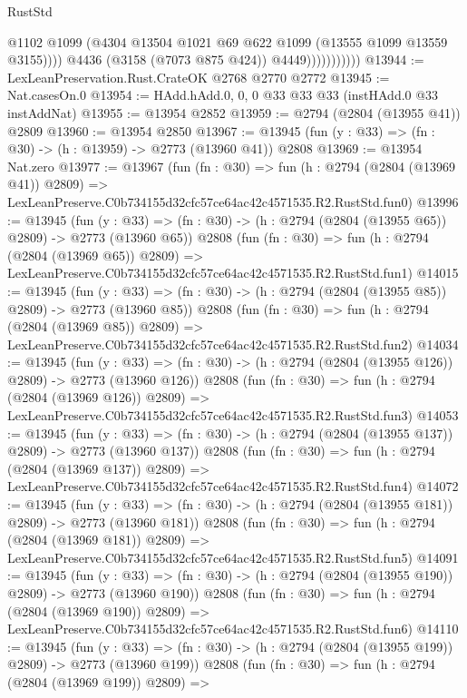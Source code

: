 \begin{lexlean}{RustStd}
\begin{coremodule}
                              @1102
                              @1099
                              (@4304 @13504 @1021 @69 @622 @1099 (@13555 @1099 @13559 @3155))))
                          @4436
                          (@3158 (@7073 @875 @424))
                          @4449)))))))))))
@13944 := LexLeanPreservation.Rust.CrateOK @2768 @2770 @2772
@13945 := Nat.casesOn.{0}
@13954 := HAdd.hAdd.{0, 0, 0} @33 @33 @33 (instHAdd.{0} @33 instAddNat)
@13955 := @13954 @2852
@13959 := @2794 (@2804 (@13955 @41)) @2809
@13960 := @13954 @2850
@13967 := @13945 (fun (y : @33) => (fn : @30) -> (h : @13959) -> @2773 (@13960 @41)) @2808
@13969 := @13954 Nat.zero
@13977 := @13967
    (fun (fn : @30) =>
    fun (h : @2794 (@2804 (@13969 @41)) @2809) =>
    LexLeanPreserve.C0b734155d32cfc57ce64ac42c4571535.R2.RustStd.fun0)
@13996 := @13945
    (fun (y : @33) => (fn : @30) -> (h : @2794 (@2804 (@13955 @65)) @2809) -> @2773 (@13960 @65))
    @2808
    (fun (fn : @30) =>
    fun (h : @2794 (@2804 (@13969 @65)) @2809) =>
    LexLeanPreserve.C0b734155d32cfc57ce64ac42c4571535.R2.RustStd.fun1)
@14015 := @13945
    (fun (y : @33) => (fn : @30) -> (h : @2794 (@2804 (@13955 @85)) @2809) -> @2773 (@13960 @85))
    @2808
    (fun (fn : @30) =>
    fun (h : @2794 (@2804 (@13969 @85)) @2809) =>
    LexLeanPreserve.C0b734155d32cfc57ce64ac42c4571535.R2.RustStd.fun2)
@14034 := @13945
    (fun (y : @33) => (fn : @30) -> (h : @2794 (@2804 (@13955 @126)) @2809) -> @2773 (@13960 @126))
    @2808
    (fun (fn : @30) =>
    fun (h : @2794 (@2804 (@13969 @126)) @2809) =>
    LexLeanPreserve.C0b734155d32cfc57ce64ac42c4571535.R2.RustStd.fun3)
@14053 := @13945
    (fun (y : @33) => (fn : @30) -> (h : @2794 (@2804 (@13955 @137)) @2809) -> @2773 (@13960 @137))
    @2808
    (fun (fn : @30) =>
    fun (h : @2794 (@2804 (@13969 @137)) @2809) =>
    LexLeanPreserve.C0b734155d32cfc57ce64ac42c4571535.R2.RustStd.fun4)
@14072 := @13945
    (fun (y : @33) => (fn : @30) -> (h : @2794 (@2804 (@13955 @181)) @2809) -> @2773 (@13960 @181))
    @2808
    (fun (fn : @30) =>
    fun (h : @2794 (@2804 (@13969 @181)) @2809) =>
    LexLeanPreserve.C0b734155d32cfc57ce64ac42c4571535.R2.RustStd.fun5)
@14091 := @13945
    (fun (y : @33) => (fn : @30) -> (h : @2794 (@2804 (@13955 @190)) @2809) -> @2773 (@13960 @190))
    @2808
    (fun (fn : @30) =>
    fun (h : @2794 (@2804 (@13969 @190)) @2809) =>
    LexLeanPreserve.C0b734155d32cfc57ce64ac42c4571535.R2.RustStd.fun6)
@14110 := @13945
    (fun (y : @33) => (fn : @30) -> (h : @2794 (@2804 (@13955 @199)) @2809) -> @2773 (@13960 @199))
    @2808
    (fun (fn : @30) =>
    fun (h : @2794 (@2804 (@13969 @199)) @2809) =>

\end{coremodule}
\end{lexlean}
